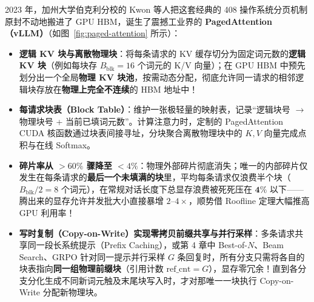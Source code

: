 2023 年，加州大学伯克利分校的 Kwon 等人把这套经典的 408 操作系统分页机制原封不动地搬进了 GPU HBM，诞生了震撼工业界的 \textbf{PagedAttention（vLLM）}（如图~\ref{fig:paged-attention} 所示）：
\begin{itemize}
  \item \textbf{逻辑 KV 块与离散物理块}：将每条请求的 KV 缓存切分为固定词元数的\textbf{逻辑 KV 块}（例如每块存 $B_{\mathrm{blk}} = 16$ 个词元的 K/V 向量）；在 GPU HBM 中预先划分出一个全局\textbf{物理 KV 块池}，按需动态分配，彻底允许同一请求的相邻逻辑块存放在\textbf{物理上完全不连续}的 HBM 地址中！
  \item \textbf{每请求块表（Block Table）}：维护一张极轻量的映射表，记录“逻辑块号 $\to$ 物理块号 + 当前已填词元数”。计算注意力时，定制的 PagedAttention CUDA 核函数通过块表间接寻址，分块聚合离散物理块中的 $K, V$ 向量完成点积与在线 Softmax。
  \item \textbf{碎片率从 $>60\%$ 骤降至 $<4\%$}：物理外部碎片彻底消失；唯一的内部碎片仅发生在每条请求的\textbf{最后一个未填满的块}里，平均每条请求仅浪费半个块（$B_{\mathrm{blk}}/2 = 8$ 个词元），在常规对话长度下总显存浪费被死死压在 $\mathbf{4\%}$ 以下——腾出来的显存允许并发批大小直接暴增 $2\text{--}4\times$，顺势借 Roofline 定理大幅推高 GPU 利用率！
  \item \textbf{写时复制（Copy-on-Write）实现零拷贝前缀共享与并行采样}：多条请求共享同一段长系统提示（Prefix Caching），或第 4 章中 Best-of-$N$、Beam Search、GRPO 针对同一提示并行采样 $G$ 条回复时，所有分支只需将各自的块表指向\textbf{同一组物理前缀块}（引用计数 $\text{ref\_cnt} = G$），显存零冗余！直到各分支分化生成不同新词元触及末尾块写入时，才对那唯一一块执行 Copy-on-Write 分配新物理块。
\end{itemize}

